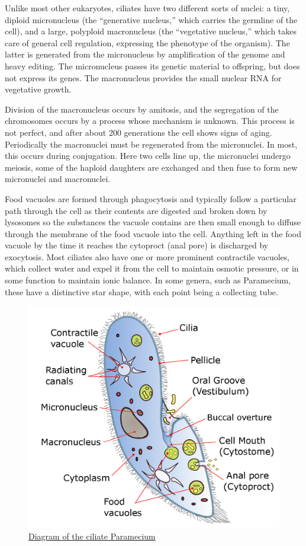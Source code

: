 Unlike most other eukaryotes, ciliates have two different sorts of nuclei: a tiny, diploid micronucleus (the ``generative nucleus,'' which carries the germline of the cell), and a large, polyploid macronucleus (the ``vegetative nucleus,'' which takes care of general cell regulation, expressing the phenotype of the organism). The latter is generated from the micronucleus by amplification of the genome and heavy editing. The micronucleus passes its genetic material to offspring, but does not express its genes. The macronucleus provides the small nuclear RNA for vegetative growth.

Division of the macronucleus occurs by amitosis, and the segregation of the chromosomes occurs by a process whose mechanism is unknown. This process is not perfect, and after about 200 generations the cell shows signs of aging. Periodically the macronuclei must be regenerated from the micronuclei. In most, this occurs during conjugation. Here two cells line up, the micronuclei undergo meiosis, some of the haploid daughters are exchanged and then fuse to form new micronuclei and macronuclei.

Food vacuoles are formed through phagocytosis and typically follow a particular path through the cell as their contents are digested and broken down by lysosomes so the substances the vacuole contains are then small enough to diffuse through the membrane of the food vacuole into the cell. Anything left in the food vacuole by the time it reaches the cytoproct (anal pore) is discharged by exocytosis. Most ciliates also have one or more prominent contractile vacuoles, which collect water and expel it from the cell to maintain osmotic pressure, or in some function to maintain ionic balance. In some genera, such as Paramecium, these have a distinctive star shape, with each point being a collecting tube.



\begin{figure}

{\centering \includegraphics[width=0.7\linewidth]{./figures/protista/Paramecium_diagram} 

}

\caption{\href{https://commons.wikimedia.org/wiki/File:Paramecium_diagram.png}{Diagram of the ciliate Paramecium}}\label{fig:parameciumdiagram}
\end{figure}

